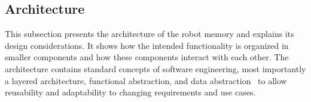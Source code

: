 \documentclass[a4paper,11pt]{article}
\begin{document}
\subsection{Architecture}
\label{sec:arch}
This subsection presents the architecture of the robot memory and
explains its design considerations. It shows how the intended
functionality is organized in smaller components and how these
components interact with each other. The architecture contains
standard concepts of software engineering, most importantly a layered
architecture, functional abstraction, and data
abstraction~\cite{software-architecture} to allow
reusability and adaptability to changing requirements and use cases.
\end{document}
